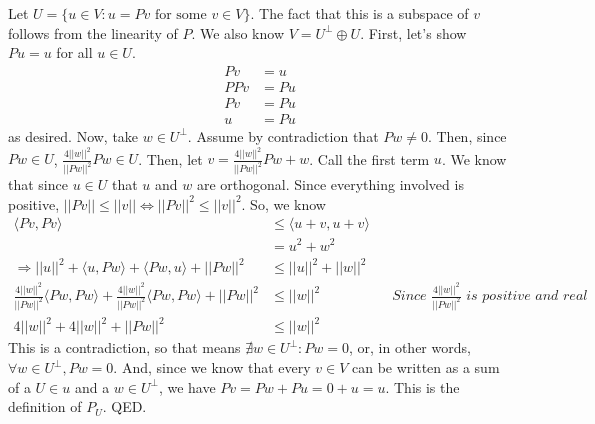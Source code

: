 \documentclass{article}
\begin{document}
Let $U = \{u\in V: u = Pv \text{ for some } v\in V\}$. The fact that this is a subspace of $v$ follows from the linearity of $P$. We also know $V = U^{\perp} \oplus U$. First, let's show $Pu = u$ for all $u \in U$. 
\begin{align*}
Pv &= u\\
PPv &= Pu\\
Pv &= Pu\\
u &= Pu
\end{align*}
as desired. Now, take $w \in U^{\perp}$. Assume by contradiction that $Pw\neq0$. Then, since $Pw \in U$, $\frac{4||w||^{2}}{||Pw||^{2}}Pw \in U$. Then, let $v = \frac{4||w||^{2}}{||Pw||^{2}}Pw + w$. Call the first term $u$. We know that since $u\in U$ that $u$ and $w$ are orthogonal.  Since everything involved is positive, $||Pv|| \leq ||v|| \iff ||Pv||^{2} \leq ||v||^{2}$. So, we know 
\begin{align*}
\langle Pv, Pv \rangle &\leq \langle u+v, u+v \rangle\\
&= u^{2} + w^{2}\\
\Longrightarrow ||u||^{2} + \langle u, Pw \rangle + \langle Pw, u \rangle + ||Pw||^{2} &\leq ||u||^{2} + ||w||^{2}\\
\frac{4||w||^{2}}{||Pw||^{2}}\langle Pw, Pw\rangle + \frac{4||w||^{2}}{||Pw||^{2}} \langle Pw, Pw \rangle + ||Pw||^{2} &\leq ||w||^{2} && \textit{Since $\frac{4||w||^{2}}{||Pw||^{2}}$ is positive and real}\\
4||w||^{2} + 4||w||^{2} + ||Pw||^{2} &\leq ||w||^{2}
\end{align*}
This is a contradiction, so that means $\nexists w \in U^{\perp}: Pw = 0$, or, in other words, $\forall w \in U^{\perp}, Pw = 0$. And, since we know that every $v \in V$ can be written as a sum of a $U \in u$ and a $w \in U^{\perp}$, we have $Pv = Pw + Pu = 0 + u = u$. This is the definition of $P_{U}$. QED.
\end{document}
